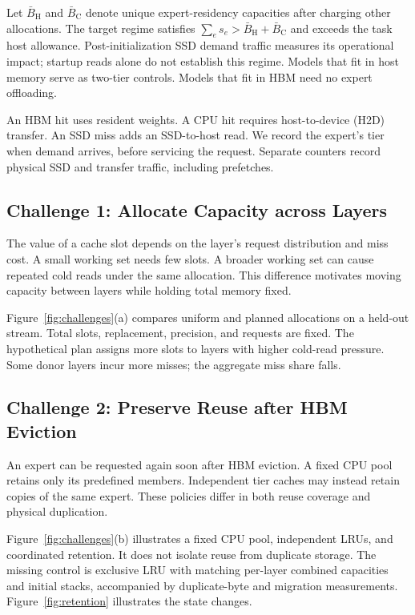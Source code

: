 \documentclass[conference,9pt,letterpaper]{IEEEtran}
\begin{document}
Let $\bar B_{\mathrm H}$ and $\bar B_{\mathrm C}$ denote unique expert-residency capacities after charging other allocations. The target regime satisfies $\sum_e s_e>\bar B_{\mathrm H}+\bar B_{\mathrm C}$ and exceeds the task host allowance. Post-initialization SSD demand traffic measures its operational impact; startup reads alone do not establish this regime. Models that fit in host memory serve as two-tier controls. Models that fit in HBM need no expert offloading.

An HBM hit uses resident weights. A CPU hit requires host-to-device (H2D) transfer. An SSD miss adds an SSD-to-host read. We record the expert's tier when demand arrives, before servicing the request. Separate counters record physical SSD and transfer traffic, including prefetches.

\subsection{Challenge 1: Allocate Capacity across Layers}
The value of a cache slot depends on the layer's request distribution and miss cost. A small working set needs few slots. A broader working set can cause repeated cold reads under the same allocation. This difference motivates moving capacity between layers while holding total memory fixed.

Figure~\ref{fig:challenges}(a) compares uniform and planned allocations on a held-out stream. Total slots, replacement, precision, and requests are fixed. The hypothetical plan assigns more slots to layers with higher cold-read pressure. Some donor layers incur more misses; the aggregate miss share falls.

\subsection{Challenge 2: Preserve Reuse after HBM Eviction}
An expert can be requested again soon after HBM eviction. A fixed CPU pool retains only its predefined members. Independent tier caches may instead retain copies of the same expert. These policies differ in both reuse coverage and physical duplication.

Figure~\ref{fig:challenges}(b) illustrates a fixed CPU pool, independent LRUs, and coordinated retention. It does not isolate reuse from duplicate storage. The missing control is exclusive LRU with matching per-layer combined capacities and initial stacks, accompanied by duplicate-byte and migration measurements. Figure~\ref{fig:retention} illustrates the state changes.
\end{document}
